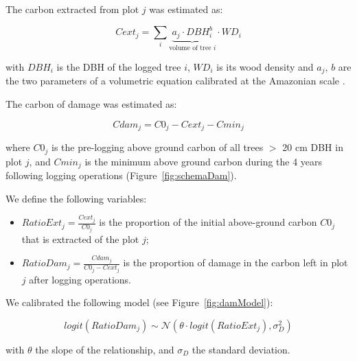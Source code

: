 \documentclass{article}
\begin{document}
The carbon extracted from plot $j$ was estimated as: 

\begin{equation}
    Cext_j = \sum_{i} \underbrace{a_j \cdot DBH_i^b}_{\text{volume of tree $i$}} \cdot WD_i
\end{equation}

with $DBH_i$ is the DBH of the logged tree $i$, $WD_i$ is its wood density and $a_j$, $b$ are the two parameters of a volumetric equation calibrated at the Amazonian scale \cite{Piponiotc}. 

The carbon of damage was estimated as: 

\begin{equation}
    Cdam_j = C0_j - Cext_j - Cmin_j
\end{equation}

where $C0_j$ is the pre-logging above ground carbon of all trees $>$ 20 cm DBH in plot $j$, and $Cmin_j$ is the minimum above ground carbon during the 4 years following logging operations (Figure~\ref{fig:schemaDam}). 

We define the following variables: 

\begin{itemize}
    \item $RatioExt_j=\frac{Cext_j}{C0_j}$ is the proportion of the initial above-ground carbon $C0_j$ that is extracted of the plot $j$; 
    \item $RatioDam_j = \frac{Cdam_j}{C0_j-Cext_j}$ is the proportion of damage in the carbon left in plot $j$ after logging operations. 
\end{itemize}

We calibrated the following model (see Figure~\ref{fig:damModel}): 

\begin{equation}
logit(RatioDam_j) \sim \mathcal{N}(\theta \cdot logit(RatioExt_j), \sigma_D^2)
\end{equation} 

with $\theta$ the slope of the relationship, and $\sigma_D$ the standard deviation. 
\end{document}
